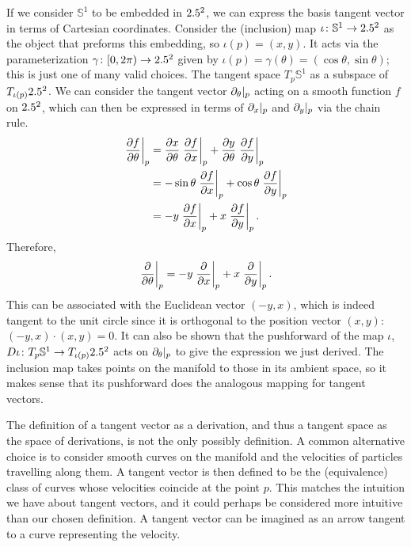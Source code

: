 \documentclass[a4paper,12pt]{article}
\begin{document}
If we consider $\mathbb{S}^1$ to be embedded in $2.5^2$, we can express the basis tangent vector in terms of Cartesian coordinates.
Consider the (inclusion) map $\iota \colon \mathbb{S}^1 \to 2.5^2$ as the object that preforms this embedding, so $\iota(p) = (x,y)$.
It acts via the parameterization $\gamma \colon [0, 2\pi) \to 2.5^2$ given by $\iota(p) = \gamma(\theta) = (\cos \theta, \sin \theta)$; this is just one of many valid choices.
The tangent space $T_p \mathbb{S}^1$ as a subspace of $T_{\iota(p)} 2.5^2$.
We can consider the tangent vector $\eval*{\partial_\theta}{p}$ acting on a smooth function $f$ on $2.5^2$, which can then be expressed in terms of $\eval*{\partial_x}{p}$ and $\eval*{\partial_y}{p}$ via the chain rule.
\begin{align*}
    \eval{\frac{\partial f}{\partial \theta}}{p} &= \frac{\partial x}{\partial \theta} \eval{\frac{\partial f}{\partial x}}{p} + \frac{\partial y}{\partial \theta} \eval{\frac{\partial f}{\partial y}}{p} \\
    &= -\sin\theta \eval{\frac{\partial f}{\partial x}}{p} + \cos\theta \eval{\frac{\partial f}{\partial y}}{p} \\
    &= -y \eval{\frac{\partial f}{\partial x}}{p} + x \eval{\frac{\partial f}{\partial y}}{p}.
\end{align*}
Therefore,
\begin{equation*}
    \eval{\frac{\partial}{\partial \theta}}{p} = -y \eval{\frac{\partial}{\partial x}}{p} + x \eval{\frac{\partial}{\partial y}}{p}.
\end{equation*}
This can be associated with the Euclidean vector $(-y, x)$, which is indeed tangent to the unit circle since it is orthogonal to the position vector $(x,y)$: $(-y, x) \cdot (x, y) = 0$.
It can also be shown that the pushforward of the map $\iota$, $D\iota \colon T_p \mathbb{S}^1 \to T_{\iota(p)} 2.5^2$ acts on $\eval*{\partial_\theta}{p}$ to give the expression we just derived.
The inclusion map takes points on the manifold to those in its ambient space, so it makes sense that its pushforward does the analogous mapping for tangent vectors.

The definition of a tangent vector as a derivation, and thus a tangent space as the space of derivations, is not the only possibly definition.
A common alternative choice is to consider smooth curves on the manifold and the velocities of particles travelling along them.
A tangent vector is then defined to be the (equivalence) class of curves whose velocities coincide at the point $p$.
This matches the intuition we have about tangent vectors, and it could perhaps be considered more intuitive than our chosen definition.
A tangent vector can be imagined as an arrow tangent to a curve representing the velocity.
\end{document}

